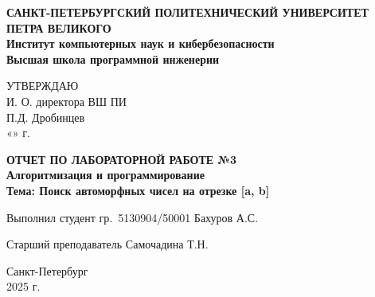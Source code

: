 \documentclass[a4paper, 12pt]{report} %
\begin{document}
	
	\begin{titlepage}
		\begin{center}
			\textbf{САНКТ-ПЕТЕРБУРГСКИЙ ПОЛИТЕХНИЧЕСКИЙ УНИВЕРСИТЕТ ПЕТРА ВЕЛИКОГО}\\
			\textbf{Институт компьютерных наук и кибербезопасности}\\
			\textbf{Высшая школа программной инженерии}\\
			\vspace{0.5cm}
			
			\begin{flushright}
				УТВЕРЖДАЮ\\
				И. О. директора ВШ ПИ\\
				П.Д. Дробинцев\\
				«\underline{\hspace{1cm}}» \underline{\hspace{3cm}}г.
			\end{flushright}
			
			\vspace{3cm}
			\textbf{ОТЧЕТ ПО ЛАБОРАТОРНОЙ РАБОТЕ №3}\\
			\vspace{0.5cm}
			\textbf{Алгоритмизация и программирование}\\
			\vspace{0.5cm}
			\textbf{Тема: Поиск автоморфных чисел на отрезке [a, b]}\\
		\end{center}
		
		\vspace{5cm}
		
		\begin{flushleft}
			Выполнил студент гр.\ 5130904/50001
			\hfill \underline{\hspace{3cm}}
			\hfill Бахуров А.С.
			
			\vspace{0.8cm}
			
			Старший преподаватель
			\hfill \underline{\hspace{3cm}}
			\hfill Самочадина Т.Н.
		\end{flushleft}
		
		\vspace{2.5cm}
		
		\begin{center}
			Санкт-Петербург\\
			2025 г.
		\end{center}
	\end{titlepage}
	
\end{document}
